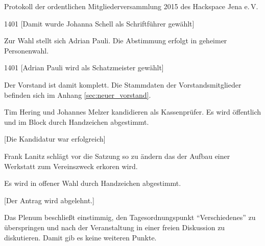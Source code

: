 \documentclass[ngerman]{scrartcl}
\begin{document}
\begin{Protokoll}{Protokoll der ordentlichen Mitgliederversammlung 2015 des Hackspace Jena e.\,V.}
\begin{Abstimmung}
  {14}{0}{1}
  [Damit wurde Johanna Schell als Schriftführer gewählt]
\end{Abstimmung}



Zur Wahl stellt sich Adrian Pauli. Die Abstimmung erfolgt in geheimer Personenwahl.

\begin{Abstimmung}
  {14}{0}{1}
  [Adrian Pauli wird als Schatzmeister gewählt]
\end{Abstimmung}


Der Vorstand ist damit komplett.
Die Stammdaten der Vorstandsmitglieder befinden sich im Anhang \ref{sec:neuer_vorstand}.


Tim Hering und Johannes Melzer kandidieren als Kassenprüfer. Es wird
öffentlich und im Block durch Handzeichen abgestimmt.
\begin{Abstimmung}
  [Die Kandidatur war erfolgreich]
\end{Abstimmung}



Frank Lanitz schlägt vor die Satzung so zu ändern das der Aufbau einer
Werkstatt zum Vereinszweck erkoren wird.

Es wird in offener Wahl durch Handzeichen abgestimmt.

\begin{Abstimmung}
  [Der Antrag wird
  abgelehnt.]
\end{Abstimmung}


Das Plenum beschließt einstimmig, den Tagesordnungspunkt
``Verschiedenes'' zu überspringen und nach der Veranstaltung in einer
freien Diskussion zu diskutieren. Damit gib es keine weiteren Punkte.


\end{Protokoll}
\end{document}
